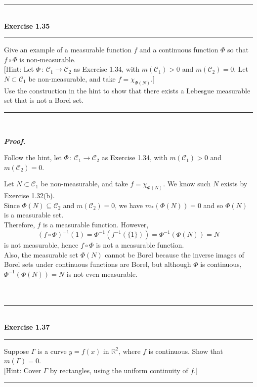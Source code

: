 \documentclass[a4paper,11pt]{article}
\begin{document}
\begin{flushleft}
	\rule[-0.5ex]{17cm}{2pt}\\
		\textbf{Exercise 1.35}\\
	\rule[1.5ex]{17cm}{0.5pt}
		Give an example of a measurable function $f$ and a continuous function $\Phi$ so that $f \circ \Phi$ is non-measurable.\\

		$[$Hint: Let $\Phi\,:\,\mathcal{C}_1 \to \mathcal{C}_2$ as Exercise 1.34, with $m(\mathcal{C}_1) > 0$ and $m(\mathcal{C}_2) = 0$. Let $N \subset \mathcal{C}_1$ be non-measurable, and take $f = \chi_{\Phi(N)}.]$\\

		Use the construction in the hint to show that there exists a Lebesgue measurable set that is not a Borel set.
	\rule[1.0ex]{17cm}{0.5pt}\
\end{flushleft}

\textbf{\textit{Proof.}}

Follow the hint, let $\Phi\,:\,\mathcal{C}_1 \to \mathcal{C}_2$ as Exercise 1.34, with $m(\mathcal{C}_1) > 0$ and $m(\mathcal{C}_2) = 0$.

Let $N \subset \mathcal{C}_1$ be non-measurable, and take $f = \chi_{\Phi(N)}$. We know such $N$ exists by Exercise 1.32(b).\\

Since $\Phi(N) \subseteq \mathcal{C}_2$ and $m(\mathcal{C}_2) = 0$, we have $m_*(\Phi(N)) = 0$ and so $\Phi(N)$ is a measurable set.\\

Therefore, $f$ is a measurable function. However,
	$$(f \circ \Phi)^{-1} (1)
	= \Phi^{-1}(f^{-1}(\{ 1 \}))
	= \Phi^{-1}(\Phi(N))
	= N$$
is not measurable, hence $f \circ \Phi$ is not a measurable function.\\

Also, the measurable set $\Phi(N)$ cannot be Borel because the inverse images of Borel sets under continuous functions are Borel, but although $\Phi$ is continuous, $\Phi^{-1}(\Phi(N)) = N$ is not even measurable.\\\\\\



\begin{flushleft}
	\rule[-0.5ex]{17cm}{2pt}\\
		\textbf{Exercise 1.37}\\
	\rule[1.5ex]{17cm}{0.5pt}
		Suppose $\Gamma$ is a curve $y = f(x)$ in $\mathbb{R}^2$, where $f$ is continuous. Show that $m(\Gamma) = 0$.\\

		$[$Hint: Cover $\Gamma$ by rectangles, using the uniform continuity of $f.]$
	\rule[1.0ex]{17cm}{0.5pt}\
\end{flushleft}
\end{document}
